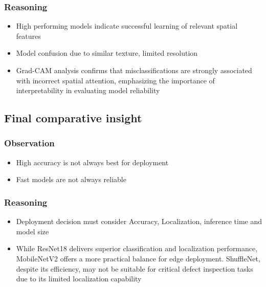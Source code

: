\subsubsection{Reasoning}
\begin{itemize}

\item High performing models indicate successful learning of relevant spatial features

\item Model confusion due to similar texture, limited resolution

\item Grad-CAM analysis confirms that misclassifications are strongly associated with incorrect spatial attention, emphasizing the importance of interpretability in evaluating model reliability

\end{itemize}

\subsection{Final comparative insight}
\subsubsection{Observation}
\begin{itemize}
\item High accuracy is not always best for deployment
\item Fast models are not always reliable
\end{itemize}


\subsubsection{Reasoning}
\begin{itemize}

\item Deployment decision must consider Accuracy, Localization, inference time and model size

\item While ResNet18 delivers superior classification and localization performance, MobileNetV2 offers a more practical balance for edge deployment. ShuffleNet, despite its efficiency, may not be suitable for critical defect inspection tasks due to its limited localization capability

\end{itemize}